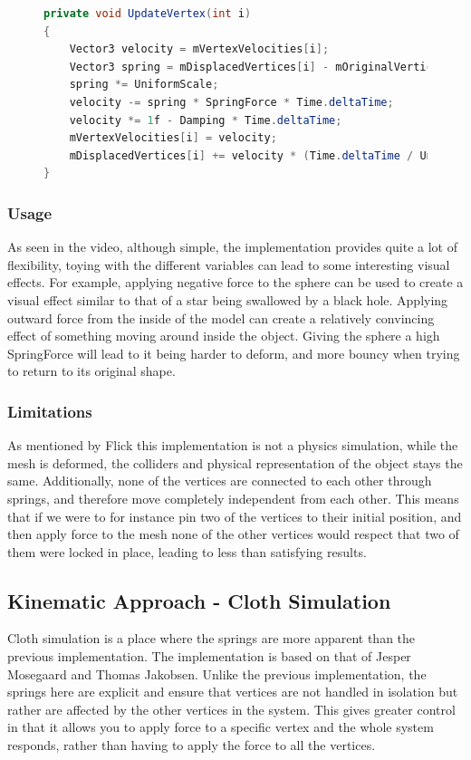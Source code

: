 \begin{figure}
\begin{lstlisting}[label={code:catlike_mesh_deformation_update},language=csharp,caption={Catlike coding mesh deformation vertex update}]
private void UpdateVertex(int i)
{
    Vector3 velocity = mVertexVelocities[i];
    Vector3 spring = mDisplacedVertices[i] - mOriginalVertices[i];
    spring *= UniformScale;
    velocity -= spring * SpringForce * Time.deltaTime;
    velocity *= 1f - Damping * Time.deltaTime;
    mVertexVelocities[i] = velocity;
    mDisplacedVertices[i] += velocity * (Time.deltaTime / UniformScale);
}
\end{lstlisting}
\end{figure}

\subsubsection{Usage}
As seen in the video, although simple, the implementation provides quite a lot of flexibility, toying with the different variables
can lead to some interesting visual effects.
For example, applying negative force to the sphere can be used to create a visual effect similar to that of a star being swallowed by a black hole.
Applying outward force from the inside of the model can create a relatively convincing effect of something moving around inside the object.
Giving the sphere a high SpringForce will lead to it being harder to deform, and more bouncy when trying to return to its original shape.

\subsubsection{Limitations}
As mentioned by Flick\cite{catlike_mesh_deformation} this implementation is not a physics simulation, while the mesh is deformed,
the colliders and physical representation of the object stays the same.
Additionally, none of the vertices are connected to each other through springs, and therefore move completely independent from each other.
This means that if we were to for instance pin two of the vertices to their initial position, and then apply force to the mesh
none of the other vertices would respect that two of them were locked in place, leading to less than satisfying results.

\subsection{Kinematic Approach - Cloth Simulation}
Cloth simulation is a place where the springs are more apparent than the previous implementation. 
The implementation is based on that of Jesper Mosegaard\cite{mosegaards_clothing_simulation} and Thomas Jakobsen\cite{jakobsen_advanced_character_physics}.
Unlike the previous implementation, the springs here are explicit and ensure that vertices are not handled in isolation but rather are affected by the other vertices in the system.
This gives greater control in that it allows you to apply force to a specific vertex and the whole system responds, rather than having to apply the force to all the vertices.

